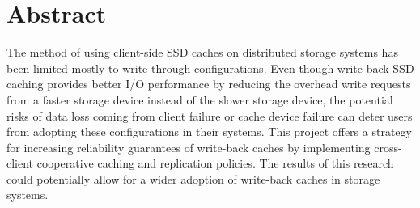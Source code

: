 \section{Abstract}

The method of using client-side SSD caches on distributed storage systems has been limited mostly to write-through configurations. Even though write-back SSD caching provides better I/O performance by reducing the overhead write requests from a faster storage device instead of the slower storage device, the potential risks of data loss coming from client failure or cache device failure can deter users from adopting these configurations in their systems. This project offers a strategy for increasing reliability guarantees of write-back caches by implementing cross-client cooperative caching and replication policies. The results of this research could potentially allow for a wider adoption of write-back caches in storage systems.

\label{abstract}
